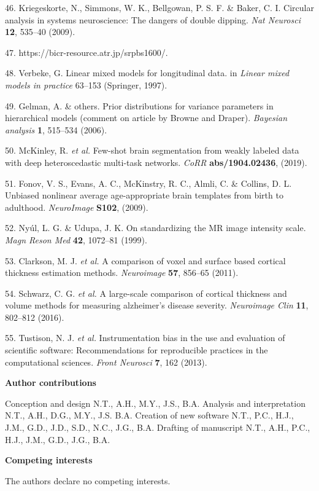 \documentclass[12pt,]{article}
\begin{document}
\leavevmode\hypertarget{ref-Kriegeskorte:2009aa}{}%
46. Kriegeskorte, N., Simmons, W. K., Bellgowan, P. S. F. \& Baker, C.
I. Circular analysis in systems neuroscience: The dangers of double
dipping. \emph{Nat Neurosci} \textbf{12}, 535--40 (2009).

\leavevmode\hypertarget{ref-srpb}{}%
47. https://bicr-resource.atr.jp/srpbs1600/.

\leavevmode\hypertarget{ref-verbeke1997linear}{}%
48. Verbeke, G. Linear mixed models for longitudinal data. in
\emph{Linear mixed models in practice} 63--153 (Springer, 1997).

\leavevmode\hypertarget{ref-gelman2006prior}{}%
49. Gelman, A. \& others. Prior distributions for variance parameters in
hierarchical models (comment on article by Browne and Draper).
\emph{Bayesian analysis} \textbf{1}, 515--534 (2006).

\leavevmode\hypertarget{ref-deepscan}{}%
50. McKinley, R. \emph{et al.} Few-shot brain segmentation from weakly
labeled data with deep heteroscedastic multi-task networks. \emph{CoRR}
\textbf{abs/1904.02436}, (2019).

\leavevmode\hypertarget{ref-Fonov:2009aa}{}%
51. Fonov, V. S., Evans, A. C., McKinstry, R. C., Almli, C. \& Collins,
D. L. Unbiased nonlinear average age-appropriate brain templates from
birth to adulthood. \emph{NeuroImage} \textbf{S102}, (2009).

\leavevmode\hypertarget{ref-Nyul:1999aa}{}%
52. Nyúl, L. G. \& Udupa, J. K. On standardizing the MR image intensity
scale. \emph{Magn Reson Med} \textbf{42}, 1072--81 (1999).

\leavevmode\hypertarget{ref-Clarkson:2011aa}{}%
53. Clarkson, M. J. \emph{et al.} A comparison of voxel and surface
based cortical thickness estimation methods. \emph{Neuroimage}
\textbf{57}, 856--65 (2011).

\leavevmode\hypertarget{ref-Schwarz:2016aa}{}%
54. Schwarz, C. G. \emph{et al.} A large-scale comparison of cortical
thickness and volume methods for measuring alzheimer's disease severity.
\emph{Neuroimage Clin} \textbf{11}, 802--812 (2016).

\leavevmode\hypertarget{ref-Tustison:2013aa}{}%
55. Tustison, N. J. \emph{et al.} Instrumentation bias in the use and
evaluation of scientific software: Recommendations for reproducible
practices in the computational sciences. \emph{Front Neurosci}
\textbf{7}, 162 (2013).



\clearpage

{\bf Author contributions}

Conception and design N.T., A.H., M.Y., J.S., B.A.
Analysis and interpretation  N.T., A.H., D.G., M.Y., J.S. B.A.
Creation of new software N.T., P.C., H.J., J.M., G.D., J.D., S.D., N.C., J.G., B.A.
Drafting of manuscript N.T., A.H., P.C., H.J., J.M., G.D., J.G., B.A.

{\bf Competing interests}

The authors declare no competing interests.
\end{document}
